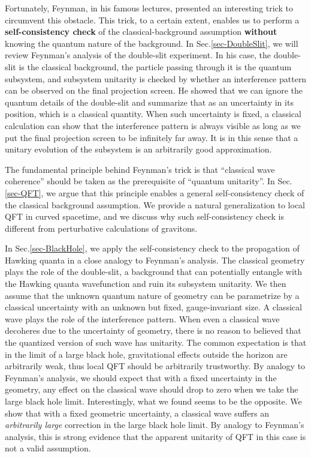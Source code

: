 \documentclass[aps,showpacs,onecolumn,floats,prd,superscriptaddress,nofootinbib]{revtex4-1}
\begin{document}
Fortunately, Feynman, in his famous lectures, presented an interesting trick to circumvent this obstacle. 
This trick, to a certain extent, enables us to perform a {\bf self-consistency check} of the classical-background assumption {\bf without} knowing the quantum nature of the background.
In Sec.\ref{sec-DoubleSlit}, we will review Feynman's analysis of the double-slit experiment. 
In his case, the double-slit is the classical background, the particle passing through it is the quantum subsystem, and subsystem unitarity is checked by whether an interference pattern can be observed on the final projection screen. 
He showed that we can ignore the quantum details of the double-slit and summarize that as an uncertainty in its position, which is a classical quantity. 
When such uncertainty is fixed, a classical calculation can show that the interference pattern is always visible as long as we put the final projection screen to be infinitely far away. 
It is in this sense that a unitary evolution of the subsystem is an arbitrarily good approximation.

The fundamental principle behind Feynman's trick is that ``classical wave coherence'' should be taken as the prerequisite of ``quantum unitarity''. 
In Sec.\ref{sec-QFT}, we argue that this principle enables a general self-consistency check of the classical background assumption. 
We provide a natural generalization to local QFT in curved spacetime, and we discuss why such self-consistency check is different from perturbative calculations of gravitons.

In Sec.\ref{sec-BlackHole}, we apply the self-consistency check to the propagation of Hawking quanta in a close analogy to Feynman's analysis. 
The classical geometry plays the role of the double-slit, a background that can potentially entangle with the Hawking quanta wavefunction and ruin its subsystem unitarity. 
We then assume that the unknown quantum nature of geometry can be parametrize by a classical uncertainty with an unknown but fixed, gauge-invariant size. 
A classical wave plays the role of the interference pattern. 
When even a classical wave decoheres due to the uncertainty of geometry, there is no reason to believed that the quantized version of such wave has unitarity.
The common expectation is that in the limit of a large black hole, gravitational effects outside the horizon are arbitrarily weak, thus local QFT should be arbitrarily trustworthy.
By analogy to Feynman's analysis, we should expect that with a fixed uncertainty in the geometry, any effect on the classical wave should drop to zero when we take the large black hole limit.
Interestingly, what we found seems to be the opposite. 
We show that with a fixed geometric uncertainty, a classical wave suffers an {\it arbitrarily large} correction in the large black hole limit.
By analogy to Feynman's analysis, this is strong evidence that the apparent unitarity of QFT in this case is not a valid assumption.
\end{document}
